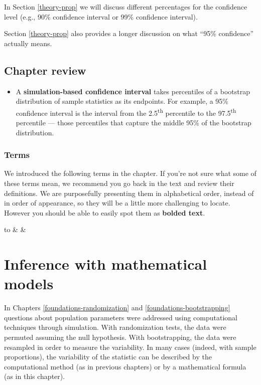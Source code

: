 \documentclass[
  10pt,
  openany]{book}
\providecommand{\tightlist}{%
  \setlength{\itemsep}{0pt}\setlength{\parskip}{0pt}}
\theoremstyle{definition}
\theoremstyle{definition}
\theoremstyle{definition}
\theoremstyle{definition}
\theoremstyle{remark}
\begin{document}
In Section \ref{theory-prop} we will discuss different percentages for the confidence level (e.g., 90\% confidence interval or 99\% confidence interval).

Section \ref{theory-prop} also provides a longer discussion on what ``95\% confidence'' actually means.

\section{Chapter review}\label{chp10-review}

\begin{itemize}
\tightlist
\item
  A \textbf{simulation-based confidence interval} takes percentiles of a bootstrap distribution of sample statistics as its endpoints. For example, a 95\% confidence interval is the interval from the 2.5\textsuperscript{th} percentile to the 97.5\textsuperscript{th} percentile --- those percentiles that capture the middle 95\% of the bootstrap distribution.
\end{itemize}

\subsection*{Terms}\label{terms-8}

We introduced the following terms in the chapter. If you're not sure what some of these terms mean, we recommend you go back in the text and review their definitions. We are purposefully presenting them in alphabetical order, instead of in order of appearance, so they will be a little more challenging to locate. However you should be able to easily spot them as \textbf{bolded text}.

\begin{tabu} to 
\toprule
{} &  & \\
\bottomrule
\end{tabu}

\chapter{Inference with mathematical models}\label{foundations-mathematical}

In Chapters \ref{foundations-randomization} and \ref{foundations-bootstrapping} questions about population parameters were addressed using computational techniques through simulation.
With randomization tests, the data were permuted assuming the null hypothesis.
With bootstrapping, the data were resampled in order to measure the variability.
In many cases (indeed, with sample proportions), the variability of the statistic can be described by the computational method (as in previous chapters) or by a mathematical formula (as in this chapter).
\end{document}
